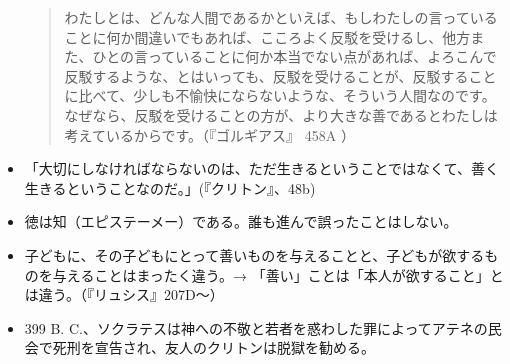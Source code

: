 \documentclass[uplatex]{bxjsarticle}
\begin{document}
\begin{itemize}
  \begin{quote}
    わたしとは、どんな人間であるかといえば、もしわたしの言っていることに何か間違いでもあれば、こころよく反駁を受けるし、他方また、ひとの言っていることに何か本当でない点があれば、よろこんで反駁するような、とはいっても、反駁を受けることが、反駁することに比べて、少しも不愉快にならないような、そういう人間なのです。なぜなら、反駁を受けることの方が、より大きな善であるとわたしは考えているからです。（『ゴルギアス』 458A ）
  \end{quote}

\item 「大切にしなければならないのは、ただ生きるということではなくて、善く生きるということなのだ。」(『クリトン』、48b)

\item 徳は知（エピステーメー）である。誰も進んで誤ったことはしない。

\item 子どもに、その子どもにとって善いものを与えることと、子どもが欲するものを与えることはまったく違う。→ 「善い」ことは「本人が欲すること」とは違う。（『リュシス』207D〜）

\item 399 B. C.、ソクラテスは神への不敬と若者を惑わした罪によってアテネの民会で死刑を宣告され、友人のクリトンは脱獄を勧める。

\end{itemize}
\end{document}
